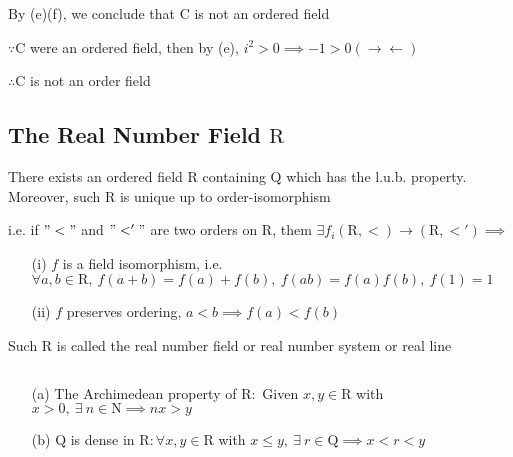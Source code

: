 \begin{rmk*}
	By (e)(f), we conclude that $\mathrm{C}$ is not an ordered field
	
	$\because \mathrm{C}$ were an ordered field, then by (e), $i^2>0 \implies -1 > 0(\rightarrow\leftarrow)$
	
	$\therefore \mathrm{C}$ is not an order field
\end{rmk*}

\subsection{The Real Number Field $\mathrm{R}$}

\begin{thm*}
	There exists an ordered field $\mathrm{R}$ containing $\mathrm{Q}$ which has the l.u.b. property. Moreover, such $\mathrm{R}$ is unique up to order-isomorphism
	
	i.e. if $"<"$ and $"<'"$ are two orders on $\mathrm{R}$, them $\exists f_i(\mathrm{R},<) \rightarrow (\mathrm{R},<') \implies$
	
	\begin{enumerate}
		\item[(i)] $f$ is a field isomorphism, i.e. $\forall a,b \in \mathrm{R},~f(a+b)=f(a)+f(b),~f(ab) = f(a)f(b),~f(1)=1$
		\item[(ii)] $f$ preserves ordering, $a<b \implies f(a) < f(b)$ 
	\end{enumerate}
	
	Such $\mathrm{R}$ is called the real number field or real number system or real line
\end{thm*}

\begin{thm*}$ $
	\begin{enumerate}
		\item[(a)] The Archimedean  property of $\mathrm{R}:$ Given $x,y \in \mathrm{R}$ with $x>0,~\exists~n \in \mathrm{N} \implies nx>y$
		\item[(b)] $\mathrm{Q}$ is dense in $\mathrm{R}: \forall x,y\in \mathrm{R}$ with $x \leq y,~\exists ~r \in \mathrm{Q} \implies x < r < y$
	\end{enumerate}
\end{thm*}

